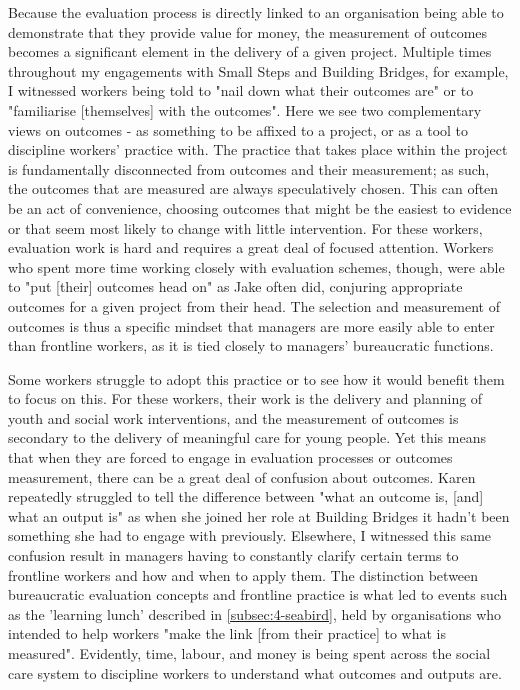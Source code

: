 Because the evaluation process is directly linked to an organisation being able to demonstrate that they provide value for money, the measurement of outcomes becomes a significant element in the delivery of a given project. Multiple times throughout my engagements with Small Steps and Building Bridges, for example, I witnessed workers being told to "nail down what their outcomes are" or to "familiarise [themselves] with the outcomes". Here we see two complementary views on outcomes - as something to be affixed to a project, or as a tool to discipline workers' practice with. The practice that takes place within the project is fundamentally disconnected from outcomes and their measurement; as such, the outcomes that are measured are always speculatively chosen. This can often be an act of convenience, choosing outcomes that might be the easiest to evidence or that seem most likely to change with little intervention. For these workers, evaluation work is hard and requires a great deal of focused attention. Workers who spent more time working closely with evaluation schemes, though, were able to "put [their] outcomes head on" as Jake often did, conjuring appropriate outcomes for a given project from their head. The selection and measurement of outcomes is thus a specific mindset that managers are more easily able to enter than frontline workers, as it is tied closely to managers' bureaucratic functions.%

Some workers struggle to adopt this practice or to see how it would benefit them to focus on this. For these workers,  their work is the delivery and planning of youth and social work interventions, and the measurement of outcomes is secondary to the delivery of meaningful care for young people. Yet this means that when they are forced to engage in evaluation processes or outcomes measurement, there can be a great deal of confusion about outcomes. Karen repeatedly struggled to tell the difference between "what an outcome is, [and] what an output is" as when she joined her role at Building Bridges it hadn't been something she had to engage with previously. Elsewhere, I witnessed this same confusion result in managers having to constantly clarify certain terms to frontline workers and how and when to apply them. The distinction between bureaucratic evaluation concepts and frontline practice is what led to events such as the 'learning lunch' described in \ref{subsec:4-seabird}, held by organisations who intended to help workers "make the link [from their practice] to what is measured". Evidently, time, labour, and money is being spent across the social care system to discipline workers to understand what outcomes and outputs are.

